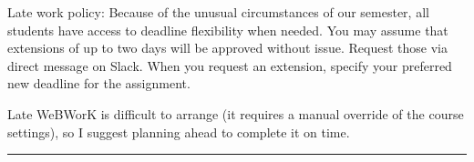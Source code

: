 \documentclass[12pt,letterpaper]{exam}
\begin{document}
\begin{questions}

 


\end{questions}


Late work policy:  Because of the unusual circumstances of our semester, all students have access to deadline flexibility when needed.  You may assume that extensions of up to two days will be approved without issue.  Request those via direct message on Slack.  When you request an extension, specify your preferred new deadline for the assignment.

Late WeBWorK is difficult to arrange (it requires a manual override of the course settings), so I suggest planning ahead to complete it on time.

\vspace{1cm} 
\hrule
\vspace{1cm}
\end{document}
